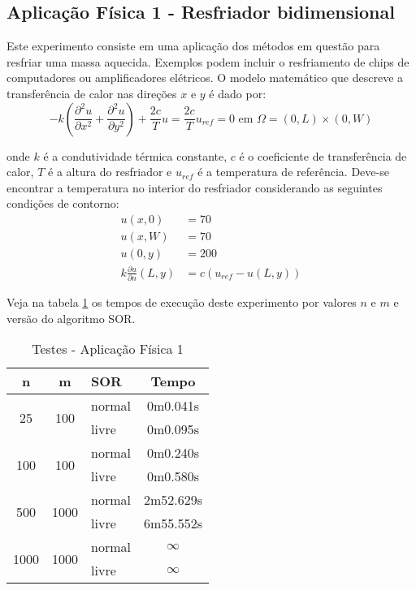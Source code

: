 \documentclass[
	11pt,				%
	oneside,			%
	a4paper,			%
	english,			%
	brazil,				%
	]{article}
\begin{document}
\subsection{Aplicação Física 1 - Resfriador bidimensional} \label{sec:a1}
Este experimento consiste em uma aplicação dos métodos em questão para resfriar 
uma massa aquecida. Exemplos podem incluir o resfriamento de chips de 
computadores ou amplificadores elétricos. O modelo matemático que descreve a 
transferência de calor nas direções $x$ e $y$ é dado por:
\begin{equation} \label{eq:a1}
- k\left(\frac{\partial^2 u}{\partial x^2} + \frac{\partial^2 u}{\partial 
y^2}\right) + \frac{2c}{T}u = \frac{2c}{T}u_{ref} = 0 \text{   em   }
\Omega = (0,L) \times (0, W)
\end{equation}

\noindent onde $k$ é a condutividade térmica constante, $c$ é o coeficiente 
de transferência de calor, $T$ é a altura do resfriador e $u_{ref}$ é a 
temperatura de referência. Deve-se encontrar a temperatura no interior do 
resfriador considerando as seguintes condições de contorno:
\begin{align*}
u(x,0) &= 70\\
u(x,W) &= 70\\
u(0,y) &= 200\\
k\frac{\partial u}{\partial n}(L,y) &= c(u_{ref} - u(L,y))
\end{align*}

Veja na tabela \ref{tab:taf1} os tempos de execução deste experimento por 
valores $n$ e $m$ e versão do algoritmo SOR.

\begin{table}[ht]
\centering
\begin{tabular}{|c|c|l|c|}
\hline 
\textbf{n} & \textbf{m} & \textbf{SOR} & \textbf{Tempo} \\
\hline
\multirow{2}{*}{25}    & \multirow{2}{*}{100}  & normal & 0m0.041s \\
                       &                       & livre  & 0m0.095s \\
\hline
\multirow{2}{*}{100}   & \multirow{2}{*}{100}  & normal & 0m0.240s \\
                       &                       & livre  & 0m0.580s \\
\hline
\multirow{2}{*}{500}   & \multirow{2}{*}{1000} & normal & 2m52.629s \\
                       &                       & livre  & 6m55.552s \\
\hline
\multirow{2}{*}{1000}  & \multirow{2}{*}{1000} & normal & $\infty$ \\
                       &                       & livre  & $\infty$ \\
\hline
\end{tabular}
\caption{Testes - Aplicação Física 1}
\label{tab:taf1}
\end{table}
\end{document}
